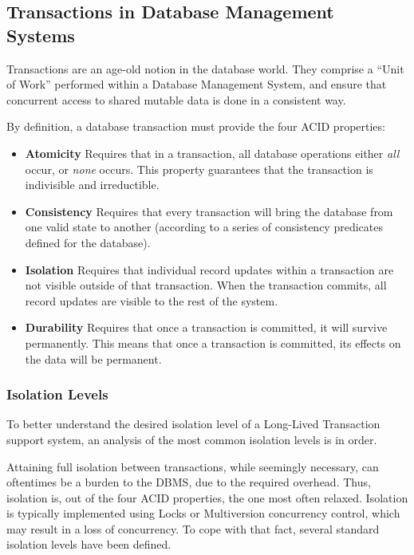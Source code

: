 \documentclass{llncs}
\begin{document}
\subsection{Transactions in Database Management Systems}
\label{sec:rdbms}

Transactions are an age-old notion in the database world. They
comprise a ``Unit of Work'' performed within a Database Management
System, and ensure that concurrent access to shared mutable data is
done in a consistent way.

By definition, a database transaction must provide the four ACID
properties:

\begin{itemize}

\item {\bf Atomicity} Requires that in a transaction, all database
  operations either {\it all} occur, or {\it none} occurs. This
  property guarantees that the transaction is indivisible and
  irreductible.

\item {\bf Consistency} Requires that every transaction will bring the
  database from one valid state to another (according to a series of
  consistency predicates defined for the database).

\item {\bf Isolation} Requires that individual record updates within a
  transaction are not visible outside of that transaction. When the
  transaction commits, all record updates are visible to the rest of
  the system.

\item {\bf Durability} Requires that once a transaction is committed,
  it will survive permanently. This means that once a transaction is
  committed, its effects on the data will be permanent.

\end{itemize}

\subsubsection{Isolation Levels}
\label{sec:isolation}

To better understand the desired isolation level of a Long-Lived
Transaction support system, an analysis of the most common isolation
levels is in order.

Attaining full isolation between transactions, while seemingly
necessary, can oftentimes be a burden to the DBMS, due to the required
overhead. Thus, isolation is, out of the four ACID properties, the one
most often relaxed. Isolation is typically implemented using Locks or
Multiversion concurrency control, which may result in a loss of
concurrency. To cope with that fact, several standard isolation levels
have been defined.
\end{document}
